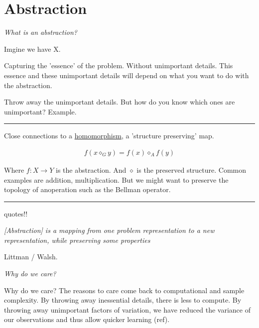 \chapter{Abstraction}\label{C:abstraction}


\begin{displayquote}
 \textit{What is an abstraction?}
\end{displayquote}

Imgine we have X.

Capturing the 'essence' of the problem. Without unimportant details.
This essence and these unimportant details will depend on what you want to do with the abstraction.

Throw away the unimportant details. But how do you know which ones are unimportant?
Example.

\begin{center}\rule{0.5\linewidth}{\linethickness}\end{center}

Close connections to a \href{https://en.wikipedia.org/wiki/Homomorphism}{homomorphism}, a 'structure preserving' map.

\begin{align*}
f(x \diamond_G y) = f(x) \diamond_A f(y)
\end{align*}

Where $f: X\to Y$ is the abstraction. And $\diamond$ is the preserved structure.
Common examples are addition, multiplication. But we might want to preserve the topology of anoperation such as the Bellman operator.

\begin{center}\rule{0.5\linewidth}{\linethickness}\end{center}

{\color{red}quotes!!}
\begin{displayquote}
  \textit{[Abstraction] is a mapping from one problem representation to a new representation, while preserving some properties}
\end{displayquote} Littman / Walsh.

\begin{displayquote}
 \textit{Why do we care?}
\end{displayquote}

Why do we care? The reasons to care come back to computational and sample complexity.
By throwing away inessential details, there is less to compute.
By throwing away unimportant factors of variation, we have reduced the variance of our observations and thus allow quicker learning (ref).

